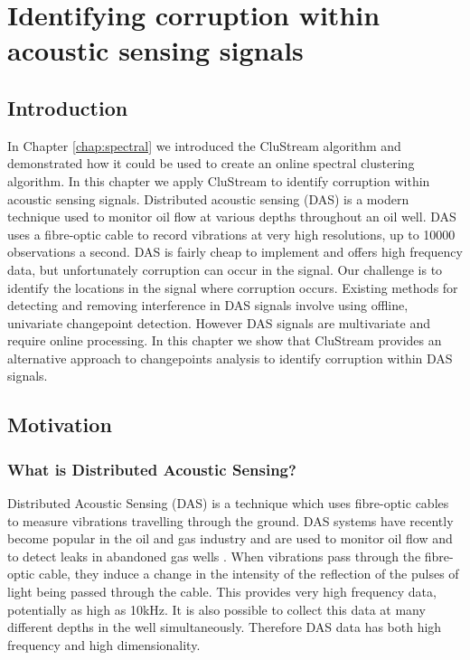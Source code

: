 %							

%								
\graphicspath{{Chapter3/figures/}} 

\chapter{Identifying corruption within acoustic sensing signals}
\label{chap:das}

\section{Introduction}
\label{sec:das_intro}

In Chapter \ref{chap:spectral} we introduced the CluStream \citep{Aggarwal2003} algorithm and demonstrated how it could be used to create an online spectral clustering algorithm. In this chapter we apply CluStream to identify corruption within acoustic sensing signals.  Distributed acoustic sensing (DAS) is a modern technique used to monitor oil flow at various depths throughout an oil  well. DAS uses a fibre-optic cable to record vibrations at very high resolutions, up to 10000 observations a second.  DAS is fairly cheap to implement and offers high frequency data, but unfortunately corruption can occur in the signal.  Our challenge is to identify the locations in the signal where corruption occurs. Existing methods for detecting and removing interference in DAS signals involve using offline, univariate changepoint detection. However DAS signals are multivariate and require online processing. In this chapter we show that CluStream  provides an alternative approach to  changepoints analysis to identify corruption within DAS signals.

\section{Motivation}
\label{sec:das_motivation}

\subsection{What is Distributed Acoustic Sensing?}

Distributed Acoustic Sensing (DAS) is a technique which uses fibre-optic cables to measure vibrations travelling through the ground. DAS systems have recently become popular in the oil and gas industry  and are used to monitor oil flow \citep{Silkina2014, VanderHorst2014} and to detect leaks in abandoned gas wells \citep{Boone2014}. When vibrations pass through the fibre-optic cable, they induce a change in the intensity of the reflection of the pulses of light being passed through the cable. This provides very high frequency data, potentially as high as 10kHz. It is also possible to collect this data at many different depths in the well simultaneously. Therefore DAS data has both high frequency and high dimensionality.

